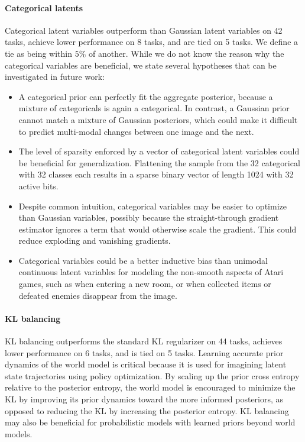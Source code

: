 \paragraph{Categorical latents}

Categorical latent variables outperform than Gaussian latent variables on 42 tasks, achieve lower performance on 8 tasks, and are tied on 5 tasks. We define a tie as being within $5\%$ of another. While we do not know the reason why the categorical variables are beneficial, we state several hypotheses that can be investigated in future work:
\begin{itemize}
\item A categorical prior can perfectly fit the aggregate posterior, because a mixture of categoricals is again a categorical. In contrast, a Gaussian prior cannot match a mixture of Gaussian posteriors, which could make it difficult to predict multi-modal changes between one image and the next.
\item The level of sparsity enforced by a vector of categorical latent variables could be beneficial for generalization. Flattening the sample from the 32 categorical with 32 classes each results in a sparse binary vector of length 1024 with 32 active bits.
\item Despite common intuition, categorical variables may be easier to optimize than Gaussian variables, possibly because the straight-through gradient estimator ignores a term that would otherwise scale the gradient. This could reduce exploding and vanishing gradients.
\item Categorical variables could be a better inductive bias than unimodal continuous latent variables for modeling the non-smooth aspects of Atari games, such as when entering a new room, or when collected items or defeated enemies disappear from the image.
\end{itemize}

\paragraph{KL balancing}

KL balancing outperforms the standard KL regularizer on 44 tasks, achieves lower performance on 6 tasks, and is tied on 5 tasks. Learning accurate prior dynamics of the world model is critical because it is used for imagining latent state trajectories using policy optimization. By scaling up the prior cross entropy relative to the posterior entropy, the world model is encouraged to minimize the KL by improving its prior dynamics toward the more informed posteriors, as opposed to reducing the KL by increasing the posterior entropy. KL balancing may also be beneficial for probabilistic models with learned priors beyond world models.

